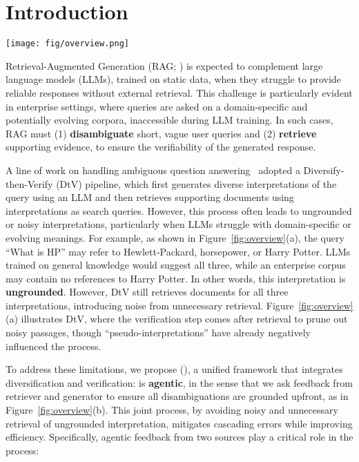 \section{Introduction}
\label{sec:intro}

\begin{figure*}
\centering
\texttt{[image: fig/overview.png]}
\caption{
Comparison of (a) DtV (Diversify-then-Verify) and (b) \ours (\ourslong, ours).
}
\label{fig:overview}
\end{figure*}


Retrieval-Augmented Generation (RAG; \citealp{lewis-etal-2020-retrieval-neurips}) is expected to complement large language models (LLMs), trained on static data, when they struggle to provide reliable responses without external retrieval.
This challenge is particularly evident in enterprise settings, where queries are asked on a domain-specific and potentially evolving corpora, inaccessible during LLM training.
In such cases, RAG must (1) \textbf{disambiguate} short, vague user queries and (2) \textbf{retrieve} supporting evidence, %
to ensure the verifiability of the generated response.

A line of work on handling ambiguous question answering~\citep{min-etal-2020-ambigqa,cole-etal-2023-selectively,in-etal-2024-diversify-arxiv} adopted a Diversify-then-Verify (DtV) pipeline, which first generates diverse interpretations of the query using an LLM and then retrieves supporting documents using interpretations as search queries.
However, this process often leads to ungrounded or noisy interpretations, particularly when LLMs struggle with domain-specific or evolving meanings. For example, as shown in Figure~\ref{fig:overview}(a), the query ``What is HP'' may refer to Hewlett-Packard, horsepower, or Harry Potter.
LLMs trained on general knowledge would suggest all three, while an enterprise corpus may contain no references to Harry Potter.
In other words, this interpretation is \textbf{ungrounded}.
However, DtV still retrieves documents for all three interpretations, introducing noise from unnecessary retrieval.
Figure~\ref{fig:overview}(a) illustrates DtV, where the verification step comes after retrieval to prune out noisy passages, though 
``pseudo-interpretations'' have already  negatively influenced the process.

To address these limitations, we propose \ours (\ourslong), a unified  framework that integrates diversification and verification:
\ours is \textbf{agentic}, in the sense that we ask feedback from retriever and generator to ensure all  disambiguations are grounded upfront, as in Figure~\ref{fig:overview}(b).
This joint process, by avoiding 
noisy and unnecessary retrieval
of ungrounded interpretation,
mitigates cascading errors while improving efficiency. 
Specifically, agentic feedback from two sources play a critical role in the process:


